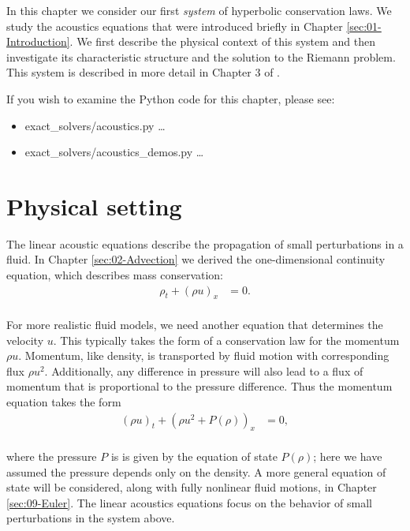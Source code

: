 \documentclass{SIAMbook2016}
\providecommand{\tightlist}{%
      \setlength{\itemsep}{0pt}\setlength{\parskip}{0pt}}
\begin{document}
In this chapter we consider our first \emph{system} of hyperbolic
conservation laws. We study the acoustics equations that were introduced
briefly in Chapter \ref{sec:01-Introduction}. We first describe the
physical context of this system and then investigate its characteristic
structure and the solution to the Riemann problem. This system is
described in more detail in Chapter 3 of \cite{fvmhp}.

If you wish to examine the Python code for this chapter, please see:

\begin{itemize}
\tightlist
\item
  {exact\_solvers/acoustics.py} \ldots{}
\item
  {exact\_solvers/acoustics\_demos.py} \ldots{}
\end{itemize}

\hypertarget{physical-setting}{%
\section{Physical setting}\label{physical-setting}}

The linear acoustic equations describe the propagation of small
perturbations in a fluid. In Chapter \ref{sec:02-Advection} we derived
the one-dimensional continuity equation, which describes mass
conservation:\\
\begin{align} \label{Ac:continuity}
    \rho_t + (\rho u)_x & = 0.
\end{align}\\
For more realistic fluid models, we need another equation that
determines the velocity \(u\). This typically takes the form of a
conservation law for the momentum \(\rho u\). Momentum, like density, is
transported by fluid motion with corresponding flux \(\rho u^2\).
Additionally, any difference in pressure will also lead to a flux of
momentum that is proportional to the pressure difference. Thus the
momentum equation takes the form\\
\begin{align} \label{Ac:mom_cons}
(\rho u)_t + (\rho u^2 + P(\rho))_x & = 0,
\end{align}\\
where the pressure \(P\) is is given by the equation of state
\(P(\rho)\); here we have assumed the pressure depends only on the
density. A more general equation of state will be considered, along with
fully nonlinear fluid motions, in Chapter \ref{sec:09-Euler}. The linear
acoustics equations focus on the behavior of small perturbations in the
system above.
\end{document}
